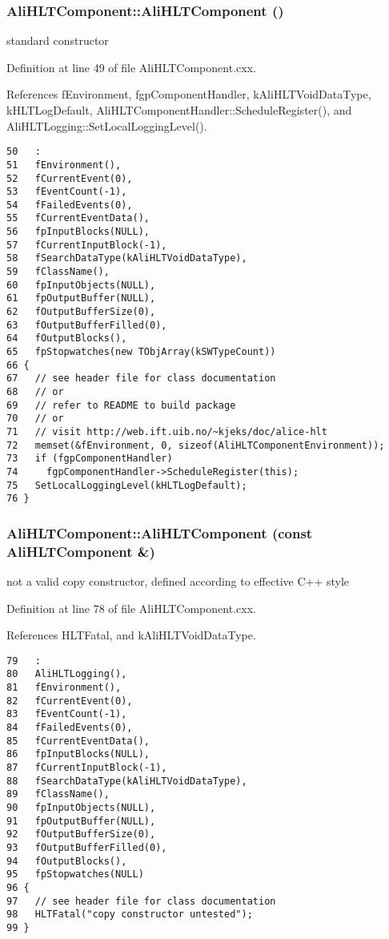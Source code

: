 \subsubsection{\setlength{\rightskip}{0pt plus 5cm}Ali\-HLTComponent::Ali\-HLTComponent ()}\label{classAliHLTComponent_a0}


standard constructor 

Definition at line 49 of file Ali\-HLTComponent.cxx.

References f\-Environment, fgp\-Component\-Handler, k\-Ali\-HLTVoid\-Data\-Type, k\-HLTLog\-Default, Ali\-HLTComponent\-Handler::Schedule\-Register(), and Ali\-HLTLogging::Set\-Local\-Logging\-Level().

\footnotesize\begin{verbatim}50   :
51   fEnvironment(),
52   fCurrentEvent(0),
53   fEventCount(-1),
54   fFailedEvents(0),
55   fCurrentEventData(),
56   fpInputBlocks(NULL),
57   fCurrentInputBlock(-1),
58   fSearchDataType(kAliHLTVoidDataType),
59   fClassName(),
60   fpInputObjects(NULL),
61   fpOutputBuffer(NULL),
62   fOutputBufferSize(0),
63   fOutputBufferFilled(0),
64   fOutputBlocks(),
65   fpStopwatches(new TObjArray(kSWTypeCount))
66 {
67   // see header file for class documentation
68   // or
69   // refer to README to build package
70   // or
71   // visit http://web.ift.uib.no/~kjeks/doc/alice-hlt
72   memset(&fEnvironment, 0, sizeof(AliHLTComponentEnvironment));
73   if (fgpComponentHandler)
74     fgpComponentHandler->ScheduleRegister(this);
75   SetLocalLoggingLevel(kHLTLogDefault);
76 }

\end{verbatim}\normalsize 


\subsubsection{\setlength{\rightskip}{0pt plus 5cm}Ali\-HLTComponent::Ali\-HLTComponent (const {\bf Ali\-HLTComponent} \&)}\label{classAliHLTComponent_a1}


not a valid copy constructor, defined according to effective C++ style 

Definition at line 78 of file Ali\-HLTComponent.cxx.

References HLTFatal, and k\-Ali\-HLTVoid\-Data\-Type.

\footnotesize\begin{verbatim}79   :
80   AliHLTLogging(),
81   fEnvironment(),
82   fCurrentEvent(0),
83   fEventCount(-1),
84   fFailedEvents(0),
85   fCurrentEventData(),
86   fpInputBlocks(NULL),
87   fCurrentInputBlock(-1),
88   fSearchDataType(kAliHLTVoidDataType),
89   fClassName(),
90   fpInputObjects(NULL),
91   fpOutputBuffer(NULL),
92   fOutputBufferSize(0),
93   fOutputBufferFilled(0),
94   fOutputBlocks(),
95   fpStopwatches(NULL)
96 {
97   // see header file for class documentation
98   HLTFatal("copy constructor untested");
99 }

\end{verbatim}\normalsize 


